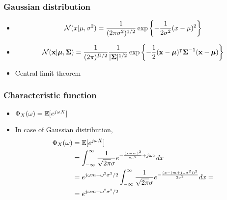 \documentclass[10pt,mathserif]{beamer}
\begin{document}
\begin{frame}
\frametitle{Gaussian distribution}
\begin{itemize}
\item
\begin{align}
\mathcal{N}(x | \mu, \sigma^2) = \frac{1}{(2\pi \sigma^2)^{1/2}}\exp\left\{-\frac{1}{2\sigma^2} (x-\mu)^2 \right\}\nonumber
\end{align}
\item 
\begin{align}
\mathcal{N}(\mathbf{x} | \boldsymbol{\mu}, \boldsymbol{\Sigma}) = \frac{1}{(2\pi)^{D/2}} \frac{1}{|\boldsymbol{\Sigma}|^{1/2}}\exp\left\{-\frac{1}{2} (\mathbf{x}-\boldsymbol{\mu})^\intercal \boldsymbol{\Sigma}^{-1}(\mathbf{x}-\boldsymbol{\mu})\right\}\nonumber
\end{align}
\item Central limit theorem 
\end{itemize}
\end{frame}
\begin{frame}
\frametitle{Characteristic function}
\begin{itemize}
\item $\Phi_X(\omega) = \mathbb{E}[e^{j\omega X}]$
\item In case of Gaussian distribution,
\begin{align}
\Phi_X(\omega) &= \mathbb{E}[e^{j\omega X}]\nonumber\\
&=\int_{-\infty}^{\infty} \frac{1}{\sqrt{2\pi}\sigma}e^{-\frac{(x-m)^2}{2\sigma^2}+j\omega x} dx \nonumber\\
&=e^{j\omega m-\omega^2\sigma^2/2}\int_{-\infty}^{\infty} \frac{1}{\sqrt{2\pi}\sigma}e^{-\frac{(x-(m+j\omega \sigma^2))^2}{2\sigma^2}} dx =\nonumber\\
&=e^{j\omega m-\omega^2\sigma^2/2} \nonumber
\end{align}
\end{itemize}
\end{frame}
      
\end{document}
